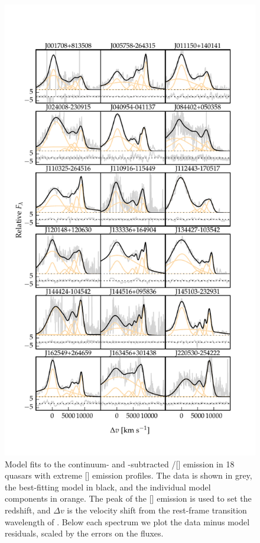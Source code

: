 \begin{figure}
    \centering
    \includegraphics[width=\columnwidth]{figures/chapter04/example_spectrum_grid_extreme_oiii.pdf} 
    \caption[{Model fits to the continuum- and -subtracted \hbns/[] emission in 18 quasars with extreme [] emission profiles.}]{Model fits to the continuum- and -subtracted \hbns/[] emission in 18 quasars with extreme [] emission profiles. The data is shown in grey, the best-fitting model in black, and the individual model components in orange. The peak of the [] emission is used to set the redshift, and $\Delta{v}$ is the velocity shift from the rest-frame transition wavelength of \hb. Below each spectrum we plot the data minus model residuals, scaled by the errors on the fluxes. }     
    \label{fig:example_spectrum_grid_extreme_oiii}
\end{figure}

